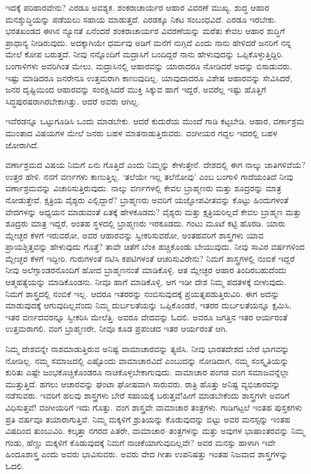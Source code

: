 ಇದಕ್ಕೆ ಪರಿಹಾರವೇನು? ಎರಡೂ ಅವಶ್ಯಕ. ಶಂಕರಾಚಾರ್ಯರ ಆಹಾರ ವಿವರಣೆ ಮುಖ್ಯ. ಶುದ್ಧ ಆಹಾರ ಮನಶ್ಶುದ್ಧಿಯನ್ನು ಪಡೆಯಲು ಸಹಾಯ ಮಾಡುತ್ತದೆ. ಎರಡಕ್ಕೂ ನಿಕಟ ಸಂಬಂಧವಿದೆ. ಎರಡೂ ಇರಬೇಕು. ಭರತಖಂಡದ ಈಗಿನ ನ್ಯೂನತೆ ಏನೆಂದರೆ ಶಂಕರಾಚಾರ್ಯರ ವಿವರಣೆಯನ್ನು ಮರೆತು ಕೇವಲ ಆಹಾರ ಶುದ್ಧಿಗೆ ಪ್ರಾಧಾನ್ಯ ನೀಡಿರುವುದು. ಅದಕ್ಕಾಗಿಯೇ ಧರ್ಮವು ಅಡಿಗೆ ಮನೆಗೆ ನುಗ್ಗಿದೆ ಎಂದು ನಾನು ಹೇಳಿದರೆ ಜನರಿಗೆ ನನ್ನ ಮೇಲೆ ಕೋಪ ಬರುತ್ತದೆ. ನೀವು ನನ್ನೊಂದಿಗೆ ಮದ್ರಾಸಿಗೆ ಬಂದಿದ್ದರೆ ನಾನು ಹೇಳುವುದನ್ನು ಒಪ್ಪಿಕೊಳ್ಳುತ್ತಿದ್ದಿರಿ. ಬಂಗಾಳಿಗಳು ಅವರಿಗಿಂತ ಮೇಲು. ಮದ್ರಾಸಿನಲ್ಲಿ ಆಹಾರವನ್ನು ಯಾರಾದರೂ ನೋಡಿದರೆ ಅದನ್ನು ಬಿಸಾಡುವರು. ಇಷ್ಟು ಮಾಡಿದರೂ ಜನರೇನೂ ಉತ್ತಮರಾಗಿ ಕಾಣುವುದಿಲ್ಲ. ಯಾವುದಾದರೂ ವಿಶೇಷ ಆಹಾರವನ್ನು ಸೇವಿಸಿದರೆ, ಜನರ ದೃಷ್ಟಿಯಿಂದ ಆಹಾರವನ್ನು ಸಂರಕ್ಷಿಸಿದರೆ ಮುಕ್ತಿ ಸಿಕ್ಕುವ ಹಾಗೆ ಇದ್ದರೆ, ಅವರೆಲ್ಲ ಇಷ್ಟು ಹೊತ್ತಿಗೆ ಸಿದ್ಧಪುರಷರಾಗಿರಬೇಕಾಗಿತ್ತು. ಆದರೆ ಅವರು ಆಗಿಲ್ಲ.

ಇವೆರಡನ್ನೂ ಒಟ್ಟುಗೂಡಿಸಿ ಒಂದು ಮಾಡಬೇಕು. ಆದರೆ ಕುದುರೆಯ ಮುಂದೆ ಗಾಡಿ ಕಟ್ಟಬೇಡಿ. ಆಹಾರ, ವರ್ಣಾಶ್ರಮ ಮುಂತಾದ ವಿಷಯಗಳ ಮೇಲೆ ಜನರು ಬಹಳ ಮಾತನಾಡುತ್ತಿರುವರು. ವಂಗೀಯರ ಗದ್ದಲ ಇದರಲ್ಲಿ ಬಹಳ ಜೋರಾಗಿದೆ.

ವರ್ಣಾಶ್ರಮದ ವಿಷಯ ನಿಮಗೆ ಏನು ಗೊತ್ತಿದೆ ಎಂದು ನಿಮ್ಮನ್ನು ಕೇಳುತ್ತೇನೆ. ದೇಶದಲ್ಲಿ ಈಗ ನಾಲ್ಕು ಜಾತಿಗಳಿವೆಯೆ? ಉತ್ತರ ಹೇಳಿ. ನನಗೆ ವರ್ಣಗಳು ಕಾಣುತ್ತಿಲ್ಲ. ‘ತಲೆಯೇ ಇಲ್ಲ ತಲೆನೋವು’ ಎಂಬ ಬಂಗಾಳಿ ಗಾದೆಯಂತಿದೆ ನೀವು ವರ್ಣಾಶ್ರಮವನ್ನು ವಿಚಾರಿಸುತ್ತಿರುವುದು. ನಾಲ್ಕು ವರ್ಣಗಳಲ್ಲಿ ಕೇವಲ ಬ್ರಾಹ್ಮಣರು ಮತ್ತು ಶೂದ್ರರನ್ನು ಮಾತ್ರ ನೋಡುತ್ತೇವೆ. ಕ್ಷತ್ರಿಯ ವೈಶ್ಯರು ಎಲ್ಲಿದ್ದಾರೆ? ಬ್ರಾಹ್ಮಣರು ಅವರಿಗೆ ಯಜ್ಞೋಪವೀತವನ್ನು ಕೊಟ್ಟು ಹಿಂದುಗಳಂತೆ ವೇದಗಳನ್ನು ಅಧ್ಯಯನ ಮಾಡುವಂತೆ ಏತಕ್ಕೆ ಹೇಳಕೂಡದು? ವೈಶ್ಯರು ಮತ್ತು ಕ್ಷತ್ರಿಯರಿಲ್ಲದೆ ಕೇವಲ ಬ್ರಾಹ್ಮಣ ಮತ್ತು ಶೂದ್ರರು ಮಾತ್ರ ಇದ್ದರೆ, ಅಂತಹ ಸ್ಥಳದಲ್ಲಿ ಬ್ರಾಹ್ಮಣರು ಇರಕೂಡದು. ಗಂಟು ಮೂಟೆ ಕಟ್ಟಿ ಹೊರಡಿ. ಯಾರು ಮ್ಲೇಚ್ಛರ ಕೆಳಗೆ ಇರುವರೋ, ಅವರ ಆಹಾರವನ್ನು ಸ್ವೀಕರಿಸುವರೋ, ಅಂತಹವರಿಗೆ ಶಾಸ್ತ್ರಗಳು ಯಾವ ಪ್ರಾಯಶ್ಚಿತ್ತವನ್ನು ಹೇಳುವುದು ಗೊತ್ತೆ? ತಾವೇ ಚಿತೆಗೆ ಬೆಂಕಿ ಹಚ್ಚಿಕೊಂಡು ಬೇಯುವುದು. ನೀವು ಸಾವಿರ ವರ್ಷಗಳಿಂದ ಮ್ಲೇಚ್ಛರ ಕೆಳಗೆ ಇದ್ದೀರಿ. ಗುರುಗಳಂತೆ ನಟಿಸಿ ಕಪಟಿಗಳಂತೆ ಆಚರಿಸುವಿರೇನು? ನಿಮಗೆ ಶಾಸ್ತ್ರಗಳಲ್ಲಿ ನಂಬಿಕೆ ಇದ್ದರೆ ನೀವು ಅಲೆಗ್ಸಾಂಡರನೊಂದಿಗೆ ಹೋದ ಬ್ರಾಹ್ಮಣನಂತೆ ಮಾಡಿಕೊಳ್ಳಿ. ಆತ ಮ್ಲೇಚ್ಛರ ಆಹಾರ ತಿಂದಿರಬಹುದೆಂದು ಆತ್ಮಹತ್ಯೆಯನ್ನು ಮಾಡಿಕೊಂಡನು. ನೀವೂ ಹಾಗೆ ಮಾಡಿಕೊಳ್ಳಿ. ಆಗ ಇಡೀ ದೇಶ ನಿಮ್ಮ ಪದತಳಕ್ಕೆ ಬೀಳುವುದು. ನಿಮಗೆ ಶಾಸ್ತ್ರದಲ್ಲಿ ನಂಬಿಕೆ ಇಲ್ಲ. ಆದರೂ ಇತರರನ್ನು ನಂಬಿಸುವುದಕ್ಕೆ ಪ್ರಯತ್ನಪಡುತ್ತಿರುವಿರಿ. ಈಗ ಅದನ್ನು ಮಾಡುವುದಕ್ಕೆ ಆಗುವು\-ದಿಲ್ಲವೆಂದು ನಿಮ್ಮ ದುರ್ಬಲತೆಯನ್ನು ಒಪ್ಪಿಕೊಂಡರೆ, ಇತರರ ದುರ್ಬಲತೆಯನ್ನೂ ಕ್ಷಮಿಸಿ. ಇತರ ವರ್ಣದವರನ್ನೂ ಸ್ವೀಕರಿಸಿ ಮೇಲೆತ್ತಿ. ಅವರೂ ವೇದವನ್ನು ಓದಲಿ. ಅವರೂ ಜಗತ್ತಿನ ಇತರ ಆರ್ಯರಂತೆ ಉತ್ತಮರಾಗಲಿ. ವಂಗ ಬ್ರಾಹ್ಮಣರೇ, ನೀವೂ ಕೂಡ ಪ್ರಪಂಚದ ಇತರ ಆರ್ಯರಂತೆ ಆಗಿ.

ನಿಮ್ಮ ದೇಶವನ್ನೇ ನಾಶಮಾಡುತ್ತಿರುವ ಅನಿಷ್ಟ ವಾಮಾಚಾರವನ್ನು ತ್ಯಜಿಸಿ. ನೀವು ಭಾರತದೇಶದ ಬೇರೆ ಭಾಗವನ್ನು ನೋಡಿಲ್ಲ. ನಮ್ಮ ಸಮಾಜದಲ್ಲಿ ಎಷ್ಟೊಂದು ವಾಮಾಚಾರವಿದೆ ಎಂಬುದನ್ನು ನೋಡಿದಾಗ, ನಮ್ಮ ಸಂಸ್ಕೃತಿಯನ್ನು ಕುರಿತು ಎಷ್ಟೇ ಜಂಭಕೊಚ್ಚಿಕೊಂಡರೂ ನಾಚಿಕೊಳ್ಳಬೇಕಾಗುವುದು. ವಾಮಾಚಾರ ಪಂಗಡ ವಂಗ ಸಮಾಜವನ್ನೆಲ್ಲಾ ಮುತ್ತುತ್ತಿದೆ. ಹಗಲು ಆಚಾರವನ್ನು ಘಂಟಾ ಘೋಷವಾಗಿ ಸಾರುವರು. ರಾತ್ರಿ ಹೊತ್ತು ಅನಿಷ್ಟ ವ್ಯಭಿಚಾರವನ್ನು ನಡೆಸುವರು. ಇವರಿಗೆ ಹಲವು ಶಾಸ್ತ್ರಗಳು ಬೇರೆ ಸಹಾಯಕ್ಕೆ ಬರುತ್ತವೆ!\break ಹೀಗೆ ಮಾಡಬೇಕೆಂದು ಶಾಸ್ತ್ರಗಳೇ ಅವರಿಗೆ ವಿಧಿಸುತ್ತವೆ! ವಂಗೀಯರಿಗೆ ಇದು ಗೊತ್ತು. ವಂಗ ಶಾಸ್ತ್ರವೇ ವಾಮಾಚಾರ ತಂತ್ರಗಳು. ಗಾಡಿಗಟ್ಟಲೆ ಇಂತಹ ಪುಸ್ತಕಗಳು ಪ್ರತಿ ವರ್ಷವೂ ತಯಾರಾಗುತ್ತಿವೆ. ನಿಮ್ಮ ಮಕ್ಕಳಿಗೆ ಶ್ರುತಿಯನ್ನು ಕೊಡುವುದನ್ನು ಬಿಟ್ಟು ಅವರ ಮನಸ್ಸನ್ನು ಇಂತಹ ವಿಷದಿಂದ ತುಂಬುವಿರಿ. ಕಲ್ಕತ್ತಾ ನಗರದ ಪಿತರೇ, ವಾಮಾಚಾರ–ತಂತ್ರಗಳನ್ನು ಮತ್ತು ಅವುಗಳ ಭಾಷಾಂತರವನ್ನು ನಿಮ್ಮ ಗಂಡು, ಹೆಣ್ಣು ಮಕ್ಕಳಿಗೆ ಕೊಡುವುದಕ್ಕೆ ನಿಮಗೆ ನಾಚಿಕೆಯಾಗುವುದಿಲ್ಲವೇ? ಅವರ ಮನಸ್ಸು ಹಾಳಾಗಿ ಇವೇ ಹಿಂದೂಶಾಸ್ತ್ರ ಎಂದು ಅವರು ಭಾವಿಸುವರು. ಅವರು ವೇದ ಗೀತಾ ಉಪನಿಷತ್ತು ಇಂತಹ ನಿಜವಾದ ಶಾಸ್ತ್ರಗಳನ್ನು ಓದಲಿ.

